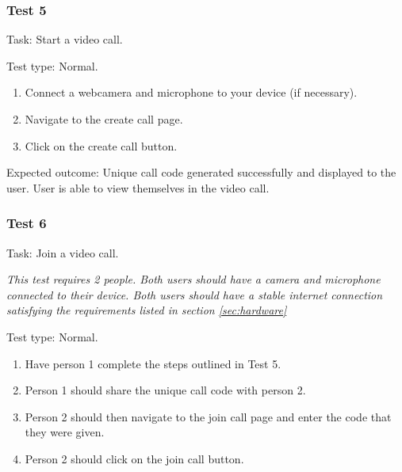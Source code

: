 {\color{gray} \hrulefill}

\subsubsection{Test 5}

{\sffamily Task:} Start a video call.\\

{\color{gray} \hrulefill}

{\sffamily Test type: Normal.}\\

\begin{enumerate}
  \item Connect a webcamera and microphone to your device (if necessary).
  \item Navigate to the create call page.
  \item Click on the create call button.
\end{enumerate}

{\sffamily Expected outcome:} Unique call code generated successfully
and displayed to the user. User is able to view themselves in
the video call.\\

{\color{gray} \hrulefill}

\vspace{0.2cm}

\subsubsection{Test 6}

{\sffamily Task:} Join a video call.\\ \vspace{0.2cm}

\textit{This test requires 2 people. Both users should have a camera
and microphone connected to their device. Both users should have a
stable internet connection satisfying the requirements listed in section \ref{sec:hardware}}\\

{\color{gray} \hrulefill}

{\sffamily Test type: Normal.}\\

\begin{enumerate}
  \item Have person 1 complete the steps outlined in Test 5.
  \item Person 1 should share the unique call code with person 2.
  \item Person 2 should then navigate to the join call page and enter the code that they were given.
  \item Person 2 should click on the join call button.
\end{enumerate}

